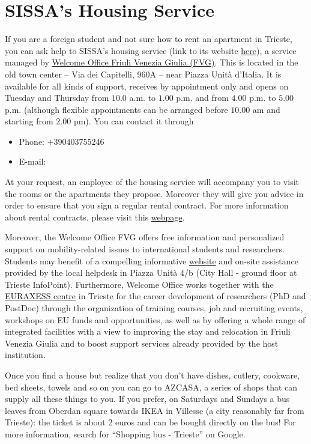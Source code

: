 \documentclass{sissavademecum}
\begin{document}
\section{SISSA's Housing Service}

If you are a foreign student and not sure how to rent an apartment in Trieste, you can ask help to SISSA's housing service (link to its website \href{https://www.sissa.it/housing}{here}), a service managed by \href{http://www.welcomeoffice.fvg.it}{Welcome Office Friuli Venezia Giulia (FVG)}. This is located in the old town center -- Via dei Capitelli, 960A -- near Piazza Unità d'Italia. It is available for all kinds of support, receives by appointment only and opens on Tuesday and Thursday from $10.0$ a.m. to $1.00$ p.m. and from $4.00$ p.m. to $5.00$ p.m. (although flexible appointments can be arranged before $10.00$ am and starting from $2.00$ pm). You can contact it through 
\begin{itemize}
	\item Phone: $+39 040 375 5246$
	\item E-mail: 
\end{itemize}

At your request, an employee of the housing service will accompany you to visit the rooms or the apartments they propose. Moreover they will give you advice in order to ensure that you sign a regular rental contract. For more information about rental contracts, please visit this \href{https://wiki.sissa.it/students/index.php/House_rental_contract}{webpage}.

Moreover, the Welcome Office FVG offers free information and personalized support on mobility-related issues to international students and researchers. Students may benefit of a compelling informative \href{link http://www.welcomeoffice.fvg.it/news/}{website} and on-site assistance provided by the local helpdesk in Piazza Unit\`a $4$/b (City Hall - ground floor at Trieste InfoPoint). Furthermore, Welcome Office works together with the \href{https://euraxess.ec.europa.eu/}{EURAXESS centre} in Trieste for the career development of researchers (PhD and PostDoc) through the organization of training courses, job and recruiting events, workshops on EU funds and opportunities, as well as by offering a whole range of integrated facilities with a view to improving the stay and relocation in Friuli Venezia Giulia and to boost support services already provided by the host institution. 

Once you find a house but realize that you don't have dishes, cutlery, cookware, bed sheets, towels and so on you can go to AZCASA, a series of shops that can supply all these things to you. If you prefer, on Saturdays and Sundays a bus leaves from Oberdan square towards IKEA in Villesse (a city reasonably far from Trieste): the ticket is about 2 euros and can be bought directly on the bus! For more information, search for ``Shopping bus - Trieste'' on Google.
\end{document}

